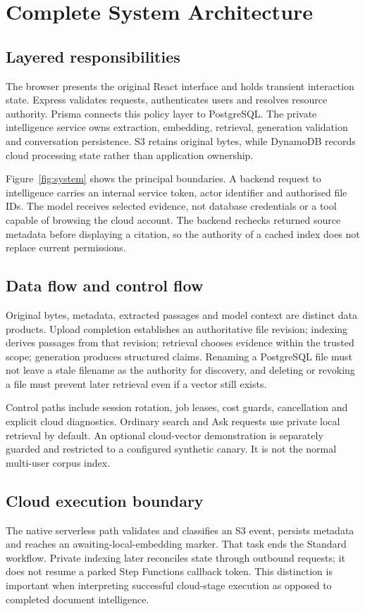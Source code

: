 \chapter{Complete System Architecture}
\section{Layered responsibilities}
The browser presents the original React interface and holds transient interaction state. Express validates requests, authenticates users and resolves resource authority. Prisma connects this policy layer to PostgreSQL. The private intelligence service owns extraction, embedding, retrieval, generation validation and conversation persistence. S3 retains original bytes, while DynamoDB records cloud processing state rather than application ownership.

Figure~\ref{fig:system} shows the principal boundaries. A backend request to intelligence carries an internal service token, actor identifier and authorised file IDs. The model receives selected evidence, not database credentials or a tool capable of browsing the cloud account. The backend rechecks returned source metadata before displaying a citation, so the authority of a cached index does not replace current permissions.
\section{Data flow and control flow}
Original bytes, metadata, extracted passages and model context are distinct data products. Upload completion establishes an authoritative file revision; indexing derives passages from that revision; retrieval chooses evidence within the trusted scope; generation produces structured claims. Renaming a PostgreSQL file must not leave a stale filename as the authority for discovery, and deleting or revoking a file must prevent later retrieval even if a vector still exists.

Control paths include session rotation, job leases, cost guards, cancellation and explicit cloud diagnostics. Ordinary search and Ask requests use private local retrieval by default. An optional cloud-vector demonstration is separately guarded and restricted to a configured synthetic canary. It is not the normal multi-user corpus index.
\section{Cloud execution boundary}
The native serverless path validates and classifies an S3 event, persists metadata and reaches an awaiting-local-embedding marker. That task ends the Standard workflow. Private indexing later reconciles state through outbound requests; it does not resume a parked Step Functions callback token. This distinction is important when interpreting successful cloud-stage execution as opposed to completed document intelligence.

